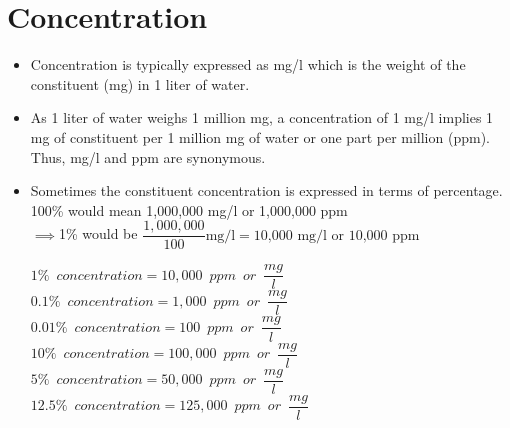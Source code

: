 \section{Concentration}
\begin{itemize}
\item Concentration is typically expressed as mg/l which is the weight of the constituent (mg) in 1 liter of water.
\item As 1 liter of water weighs 1 million mg, a concentration of 1 mg/l implies 1 mg of constituent per 1 million mg of water or one part per million (ppm).   Thus, mg/l and ppm are synonymous.
\item Sometimes the constituent concentration is expressed in terms of percentage.\\
\vspace{6pt}
100\% would mean 1,000,000 mg/l or 1,000,000 ppm\\
\vspace{0.2cm}
$\implies$1\% would be $\dfrac{1,000,000}{100}\textrm{mg/l} = \textrm{10,000 mg/l or 10,000 ppm}$\\
\vspace{0.2cm}

$1\% \enspace concentration = 10,000 \enspace ppm \enspace or \enspace\dfrac{mg}{l}$\\
$0.1\% \enspace concentration = 1,000 \enspace ppm \enspace or \enspace \dfrac{mg}{l}$\\
$0.01\% \enspace concentration = 100 \enspace ppm \enspace or \enspace \dfrac{mg}{l}$\\
$10\% \enspace concentration = 100,000 \enspace ppm \enspace or \enspace \dfrac{mg}{l}$\\
$5\% \enspace concentration = 50,000 \enspace ppm \enspace or \enspace \dfrac{mg}{l}$\\
$12.5\% \enspace concentration = 125,000 \enspace ppm \enspace or \enspace \dfrac{mg}{l}$\\
\end{itemize}

\vspace{0.3cm}

